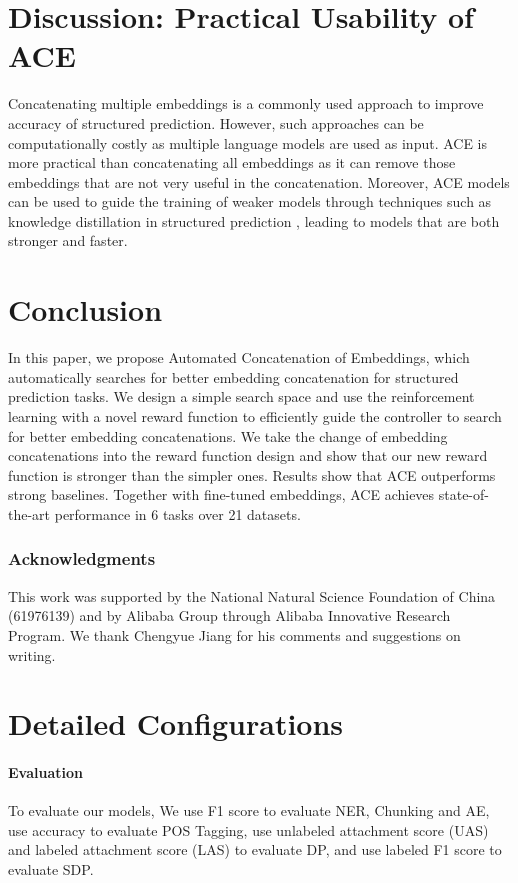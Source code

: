 \documentclass[11pt,a4paper]{article}
\begin{document}
\section{Discussion: Practical Usability of ACE}
Concatenating multiple embeddings is a commonly used approach to improve accuracy of structured prediction. However, such approaches can be computationally costly as multiple language models are used as input. ACE is more practical than concatenating all embeddings as it can remove those embeddings that are not very useful in the concatenation. Moreover, ACE models can be used to guide the training of weaker models through techniques such as knowledge distillation in structured prediction \cite{kim-rush-2016-sequence,kuncoro-etal-2016-distilling,wang-etal-2020-structure,wang2020structural}, leading to models that are both stronger and faster. 


\section{Conclusion}
In this paper, we propose Automated Concatenation of Embeddings, which automatically searches for better embedding concatenation for structured prediction tasks. We design a simple search space and use the reinforcement learning with a novel reward function to efficiently guide the controller to search for better embedding concatenations. We take the change of embedding concatenations into the reward function design and show that our new reward function is stronger than the simpler ones. Results show that ACE outperforms strong baselines. Together with fine-tuned embeddings, ACE achieves state-of-the-art performance in 6 tasks over 21 datasets.

\subsubsection*{Acknowledgments}
This work was supported by the National Natural Science Foundation of China (61976139) and by Alibaba Group through Alibaba Innovative Research Program. We thank Chengyue Jiang for his comments and suggestions on writing. 





\appendix
\section{Detailed Configurations}
\label{app:detail}
\paragraph{Evaluation}
To evaluate our models, We use F1 score to evaluate NER, Chunking and AE, use accuracy to evaluate POS Tagging, use unlabeled attachment score (UAS) and labeled attachment score (LAS) to evaluate DP, and use labeled F1 score to evaluate SDP. 
\end{document}
